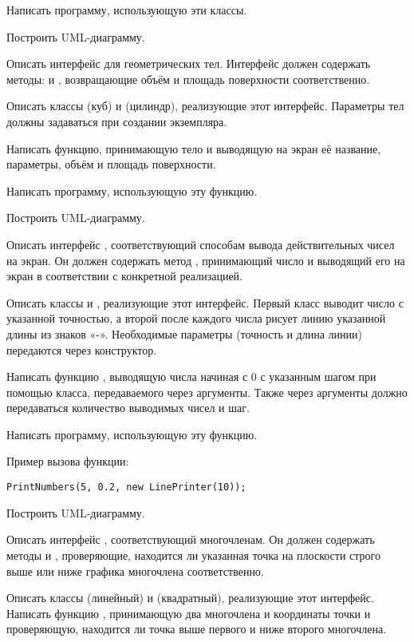 Написать программу, использующую эти классы.

Построить UML-диаграмму.

\task Описать интерфейс  для геометрических тел. Интерфейс
должен содержать методы:  и ,
возвращающие объём и площадь поверхности соответственно.

Описать классы  (куб) и  (цилиндр),
реализующие этот интерфейс. Параметры тел должны задаваться при
создании экземпляра.

Написать функцию, принимающую тело и выводящую на экран её название,
параметры, объём и площадь поверхности.

Написать программу, использующую эту функцию.

Построить UML-диаграмму.

\task Описать интерфейс , соответствующий способам
вывода действительных чисел на экран. Он должен содержать метод
, принимающий число и выводящий его на экран в соответствии
с конкретной реализацией.

Описать классы  и , реализующие
этот интерфейс. Первый класс выводит число с указанной точностью, а
второй после каждого числа рисует линию указанной длины из знаков
«-». Необходимые параметры (точность и длина линии) передаются через
конструктор.

Написать функцию , выводящую числа начиная с 0 с
указанным шагом при помощью класса, передаваемого через
аргументы. Также через аргументы должно передаваться количество
выводимых чисел и шаг.

Написать программу, использующую эту функцию.

Пример вызова функции:
\begin{lstlisting}[numbers=none]
PrintNumbers(5, 0.2, new LinePrinter(10));
\end{lstlisting}

Построить UML-диаграмму.

\task Описать интерфейс , соответствующий
многочленам. Он должен содержать методы  и ,
проверяющие, находится ли указанная точка на плоскости строго выше или
ниже графика многочлена соответственно.

Описать классы  (линейный) и  (квадратный),
реализующие этот интерфейс. Написать функцию ,
принимающую два многочлена и координаты точки и проверяющую, находится
ли точка выше первого и ниже второго многочлена.

